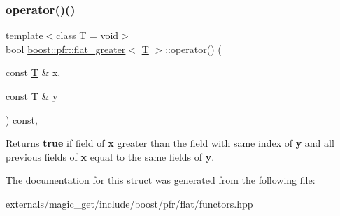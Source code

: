 \subsubsection{\texorpdfstring{operator()()}{operator()()}}
{\footnotesize\ttfamily template$<$class T  = void$>$ \\
bool \mbox{\hyperlink{structboost_1_1pfr_1_1flat__greater}{boost\+::pfr\+::flat\+\_\+greater}}$<$ \mbox{\hyperlink{struct_t}{T}} $>$\+::operator() (\begin{DoxyParamCaption}\item[{const \mbox{\hyperlink{struct_t}{T}} \&}]{x,  }\item[{const \mbox{\hyperlink{struct_t}{T}} \&}]{y }\end{DoxyParamCaption}) const\hspace{0.3cm}{\ttfamily [inline]}, {\ttfamily [noexcept]}}

\begin{DoxyReturn}{Returns}
{\bfseries true} if field of {\bfseries x} greater than the field with same index of {\bfseries y} and all previous fields of {\bfseries x} equal to the same fields of {\bfseries y}.
\end{DoxyReturn}


The documentation for this struct was generated from the following file\+:\begin{DoxyCompactItemize}
\item 
externals/magic\+\_\+get/include/boost/pfr/flat/functors.\+hpp\end{DoxyCompactItemize}
